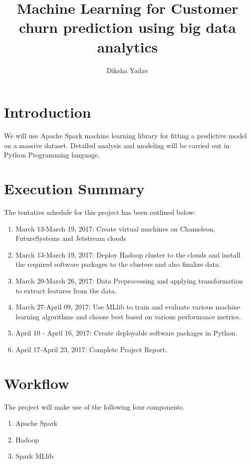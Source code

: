 \documentclass[9pt,twocolumn,twoside]{../../styles/osajnl}
\title{Machine Learning for Customer churn prediction using big data analytics}
\author[1,*]{Diksha Yadav}
\affil[1]{School of Informatics and Computing, Bloomington, IN 47408, U.S.A.}
\affil[*]{Corresponding authors: yadavd@umail.iu.edu}
\begin{document}
\flushbottom %

\maketitle %

\tableofcontents %
\maketitle

\section{Introduction}
	We will use Apache Spark\cite{www-apache-spark} machine learning library for fitting a predictive model on a
	massive dataset. Detailed analysis and modeling will be carried out in Python
	Programming language.

\section{Execution Summary}
The tentative schedule for  this project has been outlined below:
\begin{enumerate}
	\item {March 13-March 19, 2017:} Create virtual machines on Chameleon, FutureSystems
	and Jetstream clouds
	\item {March 13-March 19, 2017:} Deploy Hadoop cluster to the clouds and install the
	required software packages to the clusters and also finalize data.
	\item {March 20-March 26, 2017:} Data Preprocessing and applying transformation to
	extract features from the data.
	\item {March 27-April 09, 2017:} Use MLlib to train and evaluate various machine
	learning algorithms and choose best based on various performance metrics.
	\item {April 10 - April 16, 2017:} Create deployable software packages in Python.
	\item {April 17-April 23, 2017:} Complete Project Report.
\end{enumerate}

\section{Workflow}
The project will make use of the following four components. 
\begin{enumerate}
    \item Apache Spark
    \item Hadoop
    \item Spark MLlib

\end{enumerate}
\end{document}
